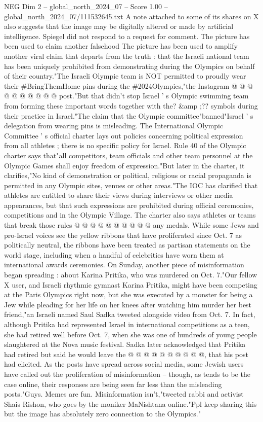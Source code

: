 \begin{textsample}{NEG Dim 2 – global\_north\_2024\_07 – Score 1.00 – global\_north\_2024\_07/111532645.txt}
A note attached to some of its shares on X also suggests that the image may be digitally altered or made by artificial intelligence.
Spiegel did not respond to a request for comment.
The picture has been used to claim another falsehood The picture has been used to amplify another viral claim that departs from the truth : that the Israeli national team has been uniquely prohibited from demonstrating during the Olympics on behalf of their country."The Israeli Olympic team is NOT permitted to proudly wear their \#BringThemHome pins during the \#2024Olympics,"the Instagram @ @ @ @ @ @ @ @ @ @ post."But that didn't stop Israel ' s Olympic swimming team from forming these important words together with the? \&amp ;?? symbols during their practice in Israel."The claim that the Olympic committee"banned"Israel ' s delegation from wearing pins is misleading.
The International Olympic Committee ' s official charter lays out policies concerning political expression from all athletes ; there is no specific policy for Israel.
Rule 40 of the Olympic charter says that"all competitors, team officials and other team personnel at the Olympic Games shall enjoy freedom of expression."But later in the charter, it clarifies,"No kind of demonstration or political, religious or racial propaganda is permitted in any Olympic sites, venues or other areas."The IOC has clarified that athletes are entitled to share their views during interviews or other media appearances, but that such expressions are prohibited during official ceremonies, competitions and in the Olympic Village.
The charter also says athletes or teams that break those rules @ @ @ @ @ @ @ @ @ @ any medals.
While some Jews and pro-Israel voices see the yellow ribbons that have proliferated since Oct. 7 as politically neutral, the ribbons have been treated as partisan statements on the world stage, including when a handful of celebrities have worn them at international awards ceremonies.
On Sunday, another piece of misinformation began spreading : about Karina Pritika, who was murdered on Oct. 7."Our fellow X user, and Israeli rhythmic gymnast Karina Pritika, might have been competing at the Paris Olympics right now, but she was executed by a monster for being a Jew while pleading for her life on her knees after watching him murder her best friend,"an Israeli named Saul Sadka tweeted alongside video from Oct. 7.
In fact, although Pritika had represented Israel in international competitions as a teen, she had retired well before Oct. 7, when she was one of hundreds of young people slaughtered at the Nova music festival.
Sadka later acknowledged that Pritika had retired but said he would leave the @ @ @ @ @ @ @ @ @ @, that his post had elicited.
As the posts have spread across social media, some Jewish users have called out the proliferation of misinformation -- though, as tends to be the case online, their responses are being seen far less than the misleading posts."Guys.
Memes are fun.
Misinformation isn't,"tweeted rabbi and activist Shais Rishon, who goes by the moniker MaNishtana online."Ppl keep sharing this but the image has absolutely zero connection to the Olympics."

\end{textsample}
